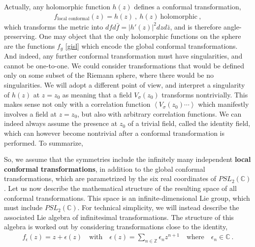 \documentclass[12pt, a4paper, notitlepage, twoside]{report}
\numberwithin{equation}{section}
\theoremstyle{break}
\begin{document}
Actually, any holomorphic function $h(z)$ defines a conformal transformation,
\begin{align}
 f_\text{local conformal}(z) = h(z) \ , \ h(z)\ \text{holomorphic}\ , 
\label{flc}
\end{align}
which transforms the metric into $dfd\bar{f} = |h'(z)|^2 dzd\bar{z}$, and is therefore angle-preserving.
One may object that the only holomorphic functions on the sphere are the functions $f_g$ \eqref{gisl} which encode the global conformal transformations.
And indeed, any further conformal transformation must have singularities, and cannot be one-to-one.
We could consider transformations that would be defined only on some subset of the Riemann sphere, where there would be no singularities.
We will adopt a different point of view, and interpret a singularity of $h(z)$ at $z=z_0$ as meaning that a field $V_\sigma(z_0)$ transforms nontrivially.
This makes sense not only with a correlation function $\left\langle V_{\sigma}(z_0)\cdots \right\rangle $ which manifestly involves a field at $z=z_0$, 
but also with arbitrary correlation functions.
We can indeed always assume the presence at $z_0$ of a trivial field, called the identity field, which can however become nontrivial after a conformal transformation is performed.
To summarize,
\begin{center}
\end{center}
So, we assume that the symmetries include the infinitely many independent \textbf{\boldmath local conformal transformations}, in addition to the global conformal transformations, which are parametrized by the six real coordinates of $PSL_2({\mathbb{C}})$.
Let us now describe the mathematical structure of the resulting space of all conformal transformations.
This space is an infinite-dimensional Lie group, which must include $PSL_2({\mathbb{C}})$.
For technical simplicity, we will instead describe the associated Lie algebra of infinitesimal transformations.
The structure of this algebra is worked out by considering transformations close to the identity, 
\begin{align}
 f_{\epsilon}(z) = z + \epsilon(z) \quad \text{with} \quad \epsilon(z) = \sum_{n\in{\mathbb{Z}}} \epsilon_n z^{n+1} \quad 
 \text{where} \quad \epsilon_n\in\mathbb{C}\ .
\label{sen}
\end{align}
\end{document}

